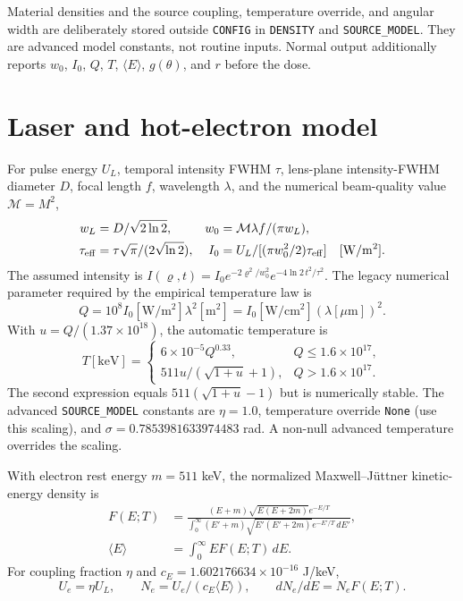 \documentclass[10pt,a4paper]{article}
\begin{document}
Material densities and the source coupling, temperature override, and angular width are deliberately stored outside \texttt{CONFIG} in \texttt{DENSITY} and \texttt{SOURCE\_MODEL}. They are advanced model constants, not routine inputs. Normal output additionally reports $w_0$, $I_0$, $Q$, $T$, $\langle E\rangle$, $g(\theta)$, and $r$ before the dose.

\section{Laser and hot-electron model}
For pulse energy $U_L$, temporal intensity FWHM $\tau$, lens-plane intensity-FWHM diameter $D$, focal length $f$, wavelength $\lambda$, and the numerical beam-quality value $\mathcal M=M^2$,
\begin{align}
w_L&=D/\sqrt{2\ln2},&w_0&=\mathcal M\lambda f/(\pi w_L),\\
\tau_{\rm eff}&=\tau\sqrt\pi/(2\sqrt{\ln2}),&
I_0&=U_L/[(\pi w_0^2/2)\tau_{\rm eff}]\quad[\mathrm{W/m^2}].
\end{align}
The assumed intensity is $I(\varrho,t)=I_0e^{-2\varrho^2/w_0^2}e^{-4\ln2\,t^2/\tau^2}$. The legacy numerical parameter required by the empirical temperature law is
\begin{equation}
Q=10^8 I_0[\mathrm{W/m^2}]\lambda^2[\mathrm m^2]
=I_0[\mathrm{W/cm^2}](\lambda[\mu\mathrm m])^2.
\end{equation}
With $u=Q/(1.37\times10^{18})$, the automatic temperature is \cite{liang}
\begin{equation}
T[\mathrm{keV}]=\begin{cases}6\times10^{-5}Q^{0.33},&Q\leq1.6\times10^{17},\\
511u/(\sqrt{1+u}+1),&Q>1.6\times10^{17}.
\end{cases}
\end{equation}
The second expression equals $511(\sqrt{1+u}-1)$ but is numerically stable. The advanced \texttt{SOURCE\_MODEL} constants are $\eta=1.0$, temperature override \texttt{None} (use this scaling), and $\sigma=0.7853981633974483$ rad. A non-null advanced temperature overrides the scaling.

With electron rest energy $m=511$ keV, the normalized Maxwell--J\"uttner kinetic-energy density is \cite{juttner}
\begin{align}
F(E;T)&=\frac{(E+m)\sqrt{E(E+2m)}e^{-E/T}}
{\int_0^\infty(E'+m)\sqrt{E'(E'+2m)}e^{-E'/T}\,dE'},\\
\langle E\rangle&=\int_0^\infty EF(E;T)\,dE.
\end{align}
For coupling fraction $\eta$ and $c_E=1.602176634\times10^{-16}$ J/keV,
\begin{equation}U_e=\eta U_L,\qquad N_e=U_e/(c_E\langle E\rangle),\qquad dN_e/dE=N_eF(E;T).\end{equation}
\end{document}
